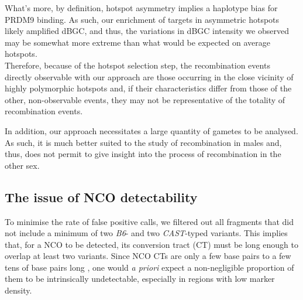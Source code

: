 What's more, by definition, hotspot asymmetry implies a haplotype bias for PRDM9 binding.
As such, our enrichment of targets in asymmetric hotspots likely amplified dBGC, and thus, the variations in dBGC intensity we observed may be somewhat more extreme than what would be expected on average hotspots.\\

Therefore, because of the hotspot selection step, the recombination events directly observable with our approach are those occurring in the close vicinity of highly polymorphic hotspots and, if their characteristics differ from those of the other, non-observable events, they may not be representative of the totality of recombination events.

In addition, our approach necessitates a large quantity of gametes to be analysed.
As such, it is much better suited to the study of recombination in males and, thus, does not permit to give insight into the process of recombination in the other sex.




\subsection{The issue of NCO detectability}

To minimise the rate of false positive calls, we filtered out all fragments that did not include a minimum of two \textit{B6}- and two \textit{CAST}-typed variants. 
This implies that, for a NCO to be detected, its conversion tract (CT) must be long enough to overlap at least two variants. 
Since NCO CTs are only a few base pairs to a few tens of base pairs long \citep{cole2014mouse}, one would \textit{a priori} expect a non-negligible proportion of them to be intrinsically undetectable, especially in regions with low marker density.


